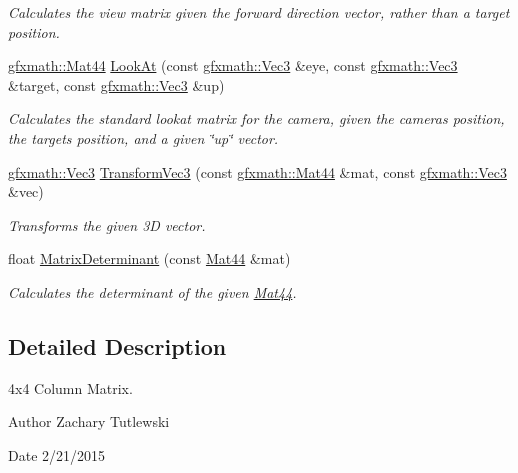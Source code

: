 \begin{DoxyCompactItemize}
\begin{DoxyCompactList}\small\item\em Calculates the view matrix given the forward direction vector, rather than a target position. \end{DoxyCompactList}\item 
\hyperlink{structgfxmath_1_1_mat44}{gfxmath\+::\+Mat44} \hyperlink{structgfxmath_1_1_mat44_a0fede110932a1103988a4b9b458513c1}{Look\+At} (const \hyperlink{structgfxmath_1_1_vec3}{gfxmath\+::\+Vec3} \&eye, const \hyperlink{structgfxmath_1_1_vec3}{gfxmath\+::\+Vec3} \&target, const \hyperlink{structgfxmath_1_1_vec3}{gfxmath\+::\+Vec3} \&up)
\begin{DoxyCompactList}\small\item\em Calculates the standard lookat matrix for the camera, given the camera\textquotesingle{}s position, the target\textquotesingle{}s position, and a given \char`\"{}up\char`\"{} vector. \end{DoxyCompactList}\item 
\hyperlink{structgfxmath_1_1_vec3}{gfxmath\+::\+Vec3} \hyperlink{structgfxmath_1_1_mat44_ab8742b2b013250f081d1229594f8259d}{Transform\+Vec3} (const \hyperlink{structgfxmath_1_1_mat44}{gfxmath\+::\+Mat44} \&mat, const \hyperlink{structgfxmath_1_1_vec3}{gfxmath\+::\+Vec3} \&vec)
\begin{DoxyCompactList}\small\item\em Transforms the given 3\+D vector. \end{DoxyCompactList}\item 
float \hyperlink{structgfxmath_1_1_mat44_a285829d964b38ad14730e85c325e775c}{Matrix\+Determinant} (const \hyperlink{structgfxmath_1_1_mat44}{Mat44} \&mat)
\begin{DoxyCompactList}\small\item\em Calculates the determinant of the given \hyperlink{structgfxmath_1_1_mat44}{Mat44}. \end{DoxyCompactList}\end{DoxyCompactItemize}


\subsection{Detailed Description}
4x4 Column Matrix. 

\begin{DoxyAuthor}{Author}
Zachary Tutlewski 
\end{DoxyAuthor}
\begin{DoxyDate}{Date}
2/21/2015 
\end{DoxyDate}


